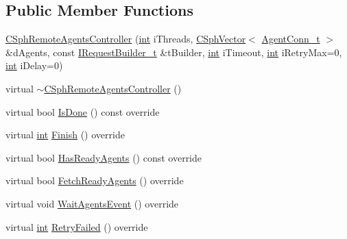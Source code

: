 \subsection*{Public Member Functions}
\begin{DoxyCompactItemize}
\item 
\hyperlink{classCSphRemoteAgentsController_aa6e4d8f8ef9353b81707c9892ecd9e53}{C\-Sph\-Remote\-Agents\-Controller} (\hyperlink{sphinxexpr_8cpp_a4a26e8f9cb8b736e0c4cbf4d16de985e}{int} i\-Threads, \hyperlink{classCSphVector}{C\-Sph\-Vector}$<$ \hyperlink{structAgentConn__t}{Agent\-Conn\-\_\-t} $>$ \&d\-Agents, const \hyperlink{structIRequestBuilder__t}{I\-Request\-Builder\-\_\-t} \&t\-Builder, \hyperlink{sphinxexpr_8cpp_a4a26e8f9cb8b736e0c4cbf4d16de985e}{int} i\-Timeout, \hyperlink{sphinxexpr_8cpp_a4a26e8f9cb8b736e0c4cbf4d16de985e}{int} i\-Retry\-Max=0, \hyperlink{sphinxexpr_8cpp_a4a26e8f9cb8b736e0c4cbf4d16de985e}{int} i\-Delay=0)
\item 
virtual \hyperlink{classCSphRemoteAgentsController_ad910e2d1d893b26a5b38d25cfd8b4be7}{$\sim$\-C\-Sph\-Remote\-Agents\-Controller} ()
\item 
virtual bool \hyperlink{classCSphRemoteAgentsController_a0cf98e2817021e221a1415a575662f14}{Is\-Done} () const override
\item 
virtual \hyperlink{sphinxexpr_8cpp_a4a26e8f9cb8b736e0c4cbf4d16de985e}{int} \hyperlink{classCSphRemoteAgentsController_aebcfc69d5d8307b2efc39b80c4137b26}{Finish} () override
\item 
virtual bool \hyperlink{classCSphRemoteAgentsController_aabd3e4854d0c12f8cf8019d5b9ac07f2}{Has\-Ready\-Agents} () const override
\item 
virtual bool \hyperlink{classCSphRemoteAgentsController_aa3ec0b3ebc62c348d156c1ef20296481}{Fetch\-Ready\-Agents} () override
\item 
virtual void \hyperlink{classCSphRemoteAgentsController_a805cdddb797c5ed1ea172d9ad72a03a2}{Wait\-Agents\-Event} () override
\item 
virtual \hyperlink{sphinxexpr_8cpp_a4a26e8f9cb8b736e0c4cbf4d16de985e}{int} \hyperlink{classCSphRemoteAgentsController_afe1477b4cf1916add2d415cabb0433fd}{Retry\-Failed} () override
\end{DoxyCompactItemize}
